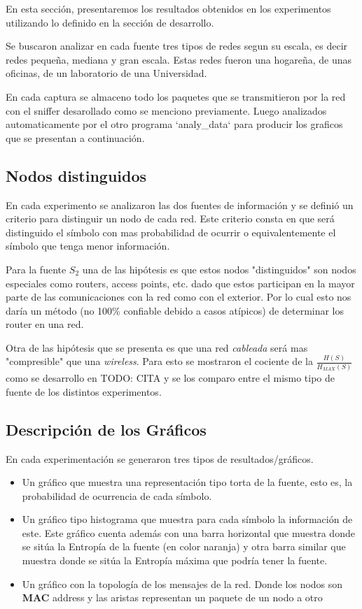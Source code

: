 En esta secci\'on, presentaremos los resultados obtenidos en los experimentos
utilizando lo definido en la secci\'on de desarrollo.

Se buscaron analizar en cada fuente tres tipos de redes segun su escala, es
decir redes pequeña, mediana y gran escala. Estas redes fueron
una hogareña, de unas oficinas, de un laboratorio de una Universidad.

En cada captura se almaceno todo los paquetes que se transmitieron por la red
con el sniffer desarollado como se menciono previamente. Luego analizados
automaticamente por el otro programa `analy\_data` para producir los graficos
que se presentan a continuación.

\subsection{Nodos distinguidos}

En cada experimento se analizaron las dos fuentes de información y se definió
un criterio para distinguir un nodo de cada red. Este criterio consta en que
será distinguido el símbolo con mas probabilidad de ocurrir o equivalentemente
el símbolo que tenga menor información.

Para la fuente $S_2$ una de las hipótesis es que estos nodos "distinguidos" son
nodos especiales como routers, access points, etc. dado que estos participan
en la mayor parte de las comunicaciones con la red como con el exterior.
Por lo cual esto nos daría un método (no 100\% confiable debido a casos
atípicos) de determinar los router en una red.

Otra de las hipótesis que se presenta es que una red \textit{cableada} será
mas "compresible" que una \textit{wireless}. Para esto se mostraron el
cociente de la $\frac{H(S)}{H_{MAX}(S)}$ como se desarrollo en TODO: CITA
y se los comparo entre el mismo tipo de fuente de los distintos experimentos.

\subsection{Descripción de los Gráficos}

En cada experimentación se generaron tres tipos de resultados/gráficos.

\begin{itemize}
	\item Un gráfico que muestra una representación tipo torta de la fuente,
	esto es, la probabilidad de ocurrencia de cada símbolo.  \item Un gráfico
	tipo histograma que muestra para cada símbolo la información de este. Este
	gráfico cuenta además con una barra horizontal que muestra donde se sitúa
	la Entropía de la fuente (en color naranja) y otra barra similar que
	muestra donde se sitúa la Entropía máxima que podría tener la fuente.
	\item Un gráfico con la topología de los mensajes de la red. Donde los
	nodos son \textbf{MAC} address y las aristas representan un paquete de un
	nodo a otro
\end{itemize}


